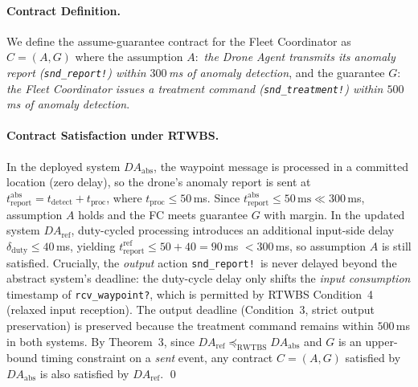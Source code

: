 
\paragraph{Contract Definition.}
We define the assume-guarantee contract for the Fleet Coordinator as
$C = (A, G)$ where the assumption
$A \colon$ \emph{the Drone Agent transmits its anomaly report
(\texttt{snd\_report!}) within $300$\,ms of anomaly detection}, and
the guarantee
$G \colon$ \emph{the Fleet Coordinator issues a treatment command
(\texttt{snd\_treatment!}) within $500$\,ms of anomaly detection}.

\paragraph{Contract Satisfaction under RTWBS.}
In the deployed system $\mathit{DA}_{\mathrm{abs}}$, the waypoint
message is processed in a committed location (zero delay), so the
drone's anomaly report is sent at
$t_{\mathrm{report}}^{\mathrm{abs}} = t_{\mathrm{detect}} + t_{\mathrm{proc}}$,
where $t_{\mathrm{proc}} \leq 50$\,ms.  Since
$t_{\mathrm{report}}^{\mathrm{abs}} \leq 50\,\text{ms} \ll 300$\,ms, assumption $A$
holds and the FC meets guarantee $G$ with margin.
%
In the updated system $\mathit{DA}_{\mathrm{ref}}$, duty-cycled
processing introduces an additional input-side delay
$\delta_{\mathrm{duty}} \leq 40$\,ms, yielding
$t_{\mathrm{report}}^{\mathrm{ref}} \leq 50 + 40 = 90$\,ms $< 300$\,ms,
so assumption $A$ is still satisfied.
%
Crucially, the \emph{output} action \texttt{snd\_report!}\ is never
delayed beyond the abstract system's deadline: the duty-cycle delay
only shifts the \emph{input consumption} timestamp of
\texttt{rcv\_waypoint?}, which is permitted by RTWBS Condition~4
(relaxed input reception).  The output deadline (Condition~3, strict
output preservation) is preserved because the treatment command
remains within $500$\,ms in both systems.
%
By Theorem~3, since $\mathit{DA}_{\mathrm{ref}} \preceq_{\mathrm{RWTBS}} \mathit{DA}_{\mathrm{abs}}$
and $G$ is an upper-bound timing constraint on a \emph{sent} event,
any contract $C = (A, G)$ satisfied by $\mathit{DA}_{\mathrm{abs}}$ is
also satisfied by $\mathit{DA}_{\mathrm{ref}}$.
\qed
